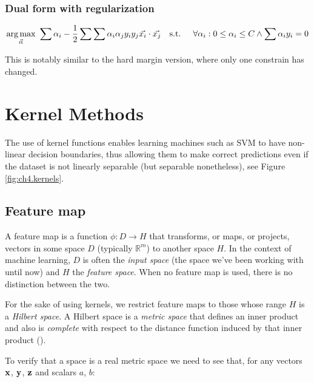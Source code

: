 \subsubsection*{Dual form with regularization}
\begin{align}\label{eq:svm_dual_reg} 
    \underset{\vec{\alpha}}{\text{arg} \max}\ \sum \alpha_i - \frac{1}{2} \sum \sum \alpha_i \alpha_j y_i y_j \vec{x_i} \cdot \vec{x_j}
    \text{\quad s.t. \quad} \forall \alpha_i : 0 \le \alpha_i \le C \land \sum \alpha_i y_i = 0
\end{align}

This is notably similar to the hard margin version, where only one constrain has changed. 

\pagebreak

\section{Kernel Methods}
\label{sec:ch4.kernels}

The use of kernel functions enables learning machines such as SVM to have non-linear decision boundaries, thus allowing them to make correct predictions even if the dataset is not linearly separable (but separable nonetheless), see Figure \ref{fig:ch4.kernels}.

\subsection{Feature map}

A feature map is a function $\phi : D \rightarrow H$ that transforms, or maps, or projects, vectors in some space $D$ (typically $\mathbb{R}^m$) to another space $H$. In the context of machine learning, $D$ is often the \emph{input space} (the space we've been working with until now) and $H$ the \emph{feature space}. When no feature map is used, there is no distinction between the two.

For the sake of using kernels, we restrict feature maps to those whose range $H$ is a \emph{Hilbert space}. A Hilbert space is a \emph{metric space} that defines an inner product and also is \emph{complete} with respect to the distance function induced by that inner product (\cite{noauthor_wikipedia_2021-1}).

To verify that a space is a real metric space we need to see that, for any vectors $\mathbf{x}$, $\mathbf{y}$, $\mathbf{z}$ and scalars $a$, $b$:

